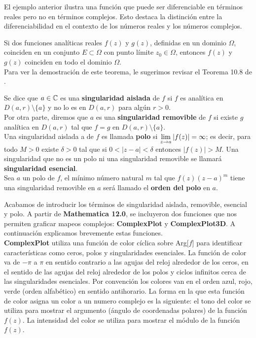 El ejemplo anterior ilustra una función que puede ser diferenciable en términos reales pero no en términos complejos. Esto destaca la distinción entre la diferenciabilidad en el contexto de los números reales y los números complejos.
\begin{teor}\label{TIFA}
	Si dos funciones analíticas reales $f(z)$ y $g(z)$, definidas en un dominio $\Omega$,
	coinciden en un conjunto $E \subset \Omega$ con punto límite $z_0 \in \Omega$, entonces $f(z)$ y $g(z)$ coinciden en todo el dominio $\Omega$.\\
	Para ver la demostración de este teorema, le sugerimos revisar el Teorema 10.8 de \cite{silverman}.
\end{teor} 
\begin{defi}
	Se dice que $a\in \mathbb{C}$ es una \textbf{singularidad aislada} de $f$ si $f$ es analítica en $D(a,r)\setminus\{a\}$ y no lo es en $D(a,r)$ para algún $r>0$.\\Por otra parte, diremos que $a$ es una \textbf{singularidad removible} de $f$ si existe $g$ analítica en $D(a,r)$ tal que $f=g$ en $D(a,r)\setminus\{a\}$.\\Una singularidad aislada a de $f$ es llamada \textbf{polo} si $\displaystyle\lim_{z\rightarrow a}|f(z)|=\infty$; es decir, para todo $M>0$ existe $\delta>0$ tal que si $0<|z-a|<\delta$ entonces $|f(z)|>M$. Una singularidad que no es un polo ni una singularidad removible se llamará
	\textbf{singularidad esencial}.\\Sea $a$ un polo de $f$, el mínimo número natural $m$ tal que $f(z)(z-a)^m$ tiene una singularidad removible en $a$ será llamado el \textbf{orden del polo} en $a$.
\end{defi}
Acabamos de introducir los términos de singularidad aislada, removible, esencial y polo.  A partir de \textbf{Mathematica 12.0}, se incluyeron dos funciones que  nos permiten graficar mapeos complejos:  \textbf{ComplexPlot} y \textbf{ComplexPlot3D}. A continuación explicamos brevemente estas funciones.\\
\textbf{ComplexPlot} utiliza una función de color cíclica sobre Arg[$f$] para identificar características como ceros, polos y singularidades esenciales. La función de color va de $-\pi$ a $\pi$ en sentido contrario a las agujas del reloj alrededor de los ceros, en el sentido de las agujas del reloj alrededor de los polos y ciclos infinitos cerca de las singularidades esenciales. Por convención los colores van en el orden azul, rojo, verde (orden alfabético) en sentido antihorario. La forma en la que esta función de color asigna un color a un numero complejo es la siguiente: el tono del color se utiliza para mostrar el argumento (ángulo de coordenadas polares) de la función $f(z)$. La intensidad del color se utiliza para mostrar el módulo de la función $f(z)$.
